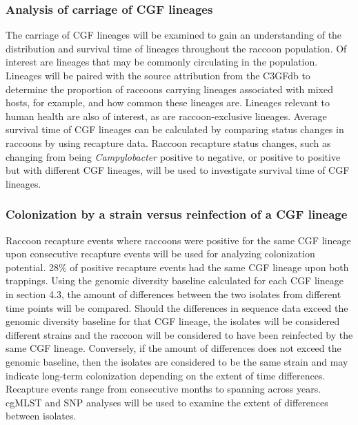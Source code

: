 \documentclass[letterpaper,titlepage,12pt]{article}
\begin{document}


 


\subsubsection{Analysis of carriage of CGF lineages} 

The carriage of CGF lineages will be examined to gain an understanding of the distribution and survival time of lineages throughout the raccoon population. Of interest are lineages that may be commonly circulating in the population. Lineages will be paired with the source attribution from the C3GFdb to determine the proportion of raccoons carrying lineages associated with mixed hosts, for example, and how common these lineages are. Lineages relevant to human health are also of interest, as are raccoon-exclusive lineages. Average survival time of CGF lineages can be calculated by comparing status changes in raccoons by using recapture data. Raccoon recapture status changes, such as changing from being \textit{Campylobacter} positive to negative, or positive to positive but with different CGF lineages, will be used to investigate survival time of CGF lineages. 


\subsubsection{Colonization by a strain versus reinfection of a CGF lineage} %

Raccoon recapture events where raccoons were positive for the same CGF lineage upon consecutive recapture events will be used for analyzing colonization potential. 28\% of positive recapture events had the same CGF lineage upon both trappings. Using the genomic diversity baseline calculated for each CGF lineage in section 4.3, the amount of differences between the two isolates from different time points will be compared. Should the differences in sequence data exceed the genomic diversity baseline for that CGF lineage, the isolates will be considered different strains and the raccoon will be considered to have been reinfected by the same CGF lineage. Conversely, if the amount of differences does not exceed the genomic baseline, then the isolates are considered to be the same strain and may indicate long-term colonization depending on the extent of time differences. Recapture events range from consecutive months to spanning across years. cgMLST and SNP analyses will be used to examine the extent of differences between isolates. 
\end{document}
